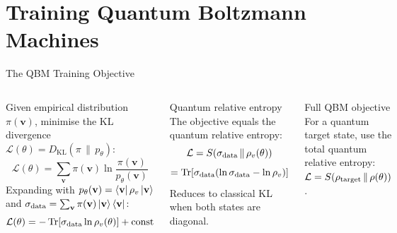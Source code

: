 \documentclass[aspectratio=169,10pt]{beamer}
\newcommand{\KL}[2]{D_{\mathrm{KL}}\!\left(#1\,\|\,#2\right)}
\begin{document}
\section{Training Quantum Boltzmann Machines}

\begin{frame}{The QBM Training Objective}
  \begin{columns}[T]
      Given empirical distribution $\pi(\mathbf{v})$, minimise
      the KL divergence $\mathcal{L}(\theta)=\KL{\pi}{p_\theta}$:
      \[
        \mathcal{L}(\theta)
        = \sum_\mathbf{v}\pi(\mathbf{v})\ln\frac{\pi(\mathbf{v})}{p_\theta(\mathbf{v})}
      \]
      Expanding with $p_\theta(\mathbf{v})=\bra{\mathbf{v}}\rho_v\ket{\mathbf{v}}$
      and $\sigma_{\rm data}=\sum_\mathbf{v}\pi(\mathbf{v})\ket{\mathbf{v}}\bra{\mathbf{v}}$:
      \[
        \mathcal{L}(\theta)
        = -\Tr[\sigma_{\rm data}\ln\rho_v(\theta)] + \mathrm{const}
      \]
      \begin{alertblock}{Quantum relative entropy}
        The objective equals the quantum relative entropy:
        \[
          \mathcal{L} = S(\sigma_{\rm data}\,\|\,\rho_v(\theta))
        \]
        \[
          = \Tr[\sigma_{\rm data}(\ln\sigma_{\rm data} - \ln\rho_v)]
        \]
        Reduces to classical KL when both states are diagonal.
      \end{alertblock}
      \vspace{0.1cm}
      \begin{block}{Full QBM objective}
        For a quantum target state, use the total quantum
        relative entropy:
        $\mathcal{L} = S(\rho_{\rm target}\,\|\,\rho(\theta))$.
      \end{block}
  \end{columns}
\end{frame}
\end{document}
